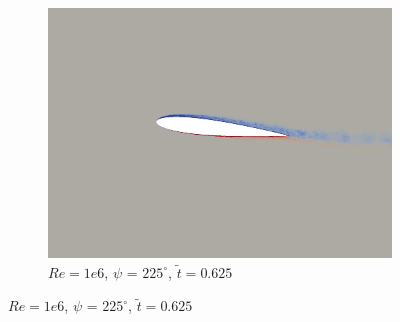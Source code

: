 \begin{figure}[H]
\begin{subfigure}[b]{0.32\textwidth}
		\includegraphics[width=1\textwidth]{figures/Vorticity_plots/Re_1m_1pt2/phase_225.png}
		\caption{$Re=1e6$, $\psi$ = $225^\circ$, $\tilde{t}=0.625$}
		\label{fig:Re_1m_1pt2_phi225}
	\end{subfigure}
	

\end{figure}
